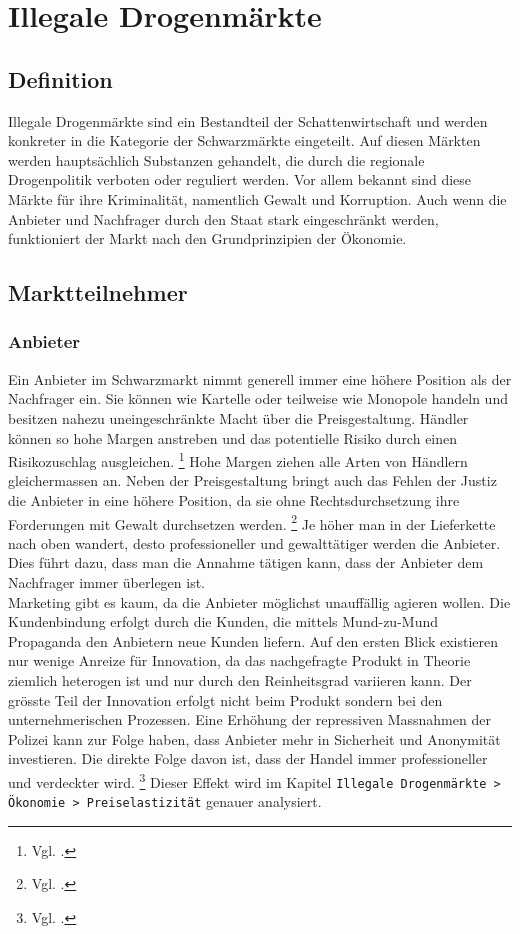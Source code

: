 \documentclass[../main.tex]{subfiles}
\begin{document}
 	\section{Illegale Drogenmärkte}
 	
 	\subsection{Definition}
 	
 	Illegale Drogenmärkte sind ein Bestandteil der Schattenwirtschaft und werden konkreter in die Kategorie der Schwarzmärkte eingeteilt.
 	Auf diesen Märkten werden hauptsächlich Substanzen gehandelt, die durch die regionale Drogenpolitik verboten oder reguliert werden.
 	Vor allem bekannt sind diese Märkte für ihre Kriminalität, namentlich Gewalt und Korruption.
 	Auch wenn die Anbieter und Nachfrager durch den Staat stark eingeschränkt werden, funktioniert der Markt nach den Grundprinzipien der Ökonomie.
 		
	
	\subsection{Marktteilnehmer}	
	
	\subsubsection{Anbieter}	
	Ein Anbieter im Schwarzmarkt nimmt generell immer eine höhere Position als der Nachfrager ein.
	Sie können wie Kartelle oder teilweise wie Monopole handeln und besitzen nahezu uneingeschränkte Macht über die Preisgestaltung.
	Händler können so hohe Margen anstreben und das potentielle Risiko durch einen Risikozuschlag ausgleichen.%
	\footnote{Vgl. \cite{becker-2006}.}
	Hohe Margen ziehen alle Arten von Händlern gleichermassen an.
	Neben der Preisgestaltung bringt auch das Fehlen der Justiz die Anbieter in eine höhere Position, da sie ohne Rechtsdurchsetzung ihre Forderungen mit Gewalt durchsetzen werden.%
	\footnote{Vgl. \cite{departmentofjustice-1994}.}
	Je höher man in der Lieferkette nach oben wandert, desto professioneller und gewalttätiger werden die Anbieter. 
	Dies führt dazu, dass man die Annahme tätigen kann, dass der Anbieter dem Nachfrager immer überlegen ist.\\
	
	\noindent
	Marketing gibt es kaum, da die Anbieter möglichst unauffällig agieren wollen.
	Die Kundenbindung erfolgt durch die Kunden, die mittels Mund-zu-Mund Propaganda den Anbietern neue Kunden liefern.
	Auf den ersten Blick existieren nur wenige Anreize für Innovation, da das nachgefragte Produkt in Theorie ziemlich heterogen ist und nur durch den Reinheitsgrad variieren kann.		
	Der grösste Teil der Innovation erfolgt nicht beim Produkt sondern bei den unternehmerischen Prozessen. 
	Eine Erhöhung der repressiven Massnahmen der Polizei kann zur Folge haben, dass Anbieter mehr in Sicherheit und Anonymität investieren.
	Die direkte Folge davon ist, dass der Handel immer professioneller und verdeckter wird.%
\footnote{Vgl. \cite{haucap-2018}.}
	Dieser Effekt wird im Kapitel \texttt{Illegale Drogenmärkte > Ökonomie > Preiselastizität} genauer analysiert.
	
\end{document}
